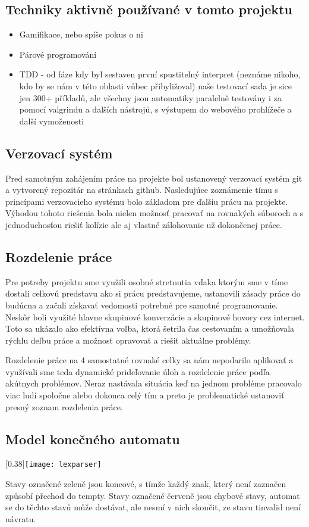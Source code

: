 \documentclass[a4paper]{article}
\begin{document}
\subsection{Techniky aktivně používané v tomto projektu}
\begin{itemize}
	\item Gamifikace, nebo spíše pokus o ni 
	\item Párové programování
	\item TDD - od fáze kdy byl sestaven první spustitelný interpret (neznáme nikoho, kdo by se nám v této oblasti vůbec přibyližoval) naše testovací sada je sice jen 300+ příkladů, ale všechny jsou automatiky paralelně testovány i za pomocí valgrindu a dalších nástrojů, s výstupem do webového prohlížeče a další vymoženosti
\end{itemize}


\subsection{Verzovací systém}
Pred samotným zahájením práce na projekte bol ustanovený verzovací systém git a vytvorený repozitár na stránkach github. Nasledujúce zoznámenie tímu s princípami verzovacieho systému bolo základom pre ďalšiu prácu na projekte. Výhodou tohoto riešenia bola nielen možnosť pracovať na rovnakých súboroch a s jednoduchosťou riešiť kolízie ale aj vlastné zálohovanie už dokončenej práce.
 
\subsection{Rozdelenie práce}
Pre potreby projektu sme využili osobné stretnutia vďaka ktorým sme v tíme dostali celkovú predstavu ako si prácu predstavujeme, ustanovili zásady práce do budúcna a začali získavať vedomosti potrebné pre samotné programovanie. Neskôr boli využité hlavne skupinové konverzácie a skupinové hovory cez internet. Toto sa ukázalo ako efektívna voľba, ktorá šetrila čas cestovaním a umožňovala rýchlu deľbu práce a možnosť opravovať a riešiť aktuálne problémy.

Rozdelenie práce na 4 samostatné rovnaké celky sa nám nepodarilo aplikovať a využívali sme teda dynamické prideľovanie úloh a rozdelenie práce podľa akútnych problémov. Neraz nastávala situácia keď na jednom probléme pracovalo viac ludí spoločne alebo dokonca celý tím a preto je problematické ustanoviť presný zoznam rozdelenia práce.

\clearpage
\begin{landscape}
\section{Model konečného automatu}
\scalebox{0.40}[0.38]{\texttt{[image: lexparser]}}
\end{landscape}
\clearpage
Stavy označené zeleně jsou koncové, s tímže každý znak, který není zaznačen způsobí přechod do t\textunderscore empty.
Stavy označené červeně jsou chybové stavy, automat se do těchto stavů může dostávat, ale nesmí v nich skončit, ze stavu t\textunderscore invalid není návratu.
\end{document}
